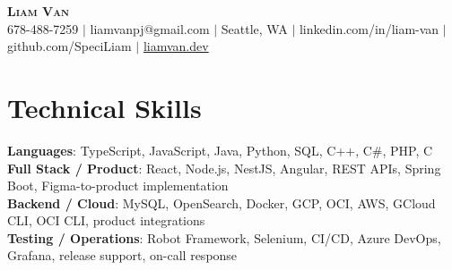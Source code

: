 \documentclass[letterpaper,11pt]{article}
\begin{document}

%
\begin{center}
    \textbf{\Huge \scshape Liam Van} \\ \vspace{1pt}
    \small 678-488-7259 $|$ liamvanpj@gmail.com $|$ Seattle, WA $|$
    linkedin.com/in/liam-van $|$ github.com/SpeciLiam $|$ \href{https://liamvan.dev}{liamvan.dev}

\end{center}

\section{Technical Skills}
 \begin{itemize}[leftmargin=0.15in, label={}]
    \small{\item{
     \textbf{Languages}{: TypeScript, JavaScript, Java, Python, SQL, C++, C\#, PHP, C} \\
     \textbf{Full Stack / Product}{: React, Node.js, NestJS, Angular, REST APIs, Spring Boot, Figma-to-product implementation} \\
     \textbf{Backend / Cloud}{: MySQL, OpenSearch, Docker, GCP, OCI, AWS, GCloud CLI, OCI CLI, product integrations} \\
     \textbf{Testing / Operations}{: Robot Framework, Selenium, CI/CD, Azure DevOps, Grafana, release support, on-call response} \\
    }}
 \end{itemize}
%

\end{document}
